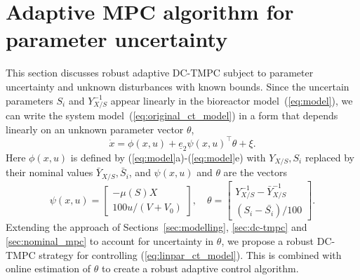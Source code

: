 \documentclass[final,5p,times,twocolumn,authoryear]{elsarticle}
\begin{document}


\section{Adaptive MPC algorithm for parameter uncertainty}\label{sec:ampc}

This section discusses robust adaptive DC-TMPC subject to parameter uncertainty and unknown disturbances with known bounds.
%
Since the uncertain parameters  $S_i$ and $Y_{X/S}^{-1}$ appear linearly in the bioreactor model~(\ref{eq:model}), we can write the system model~(\ref{eq:original_ct_model}) in a form that depends linearly on an unknown parameter vector $\theta$,
\begin{equation}\label{eq:linpar_ct_model}
  \dot{x} =\phi(x,u) + \underline{e}_2 \psi(x,u)^\top \theta + \xi .
\end{equation}
Here $\phi(x,u)$ is defined by (\ref{eq:model}a)-(\ref{eq:model}e) with $Y_{X/S}, S_i$ replaced by their nominal values $\bar{Y}_{X/S}, \bar{S}_i$, and $\psi(x,u)$ and $\theta$ are the vectors
\[
  \psi (x, u ) = \begin{bmatrix} -\mu(S) X \\ 100 u/(V+V_0) \end{bmatrix} ,
  \quad
\theta = \begin{bmatrix} Y_{X/S}^{-1} - \bar{Y}_{X/S}^{-1} \\ (S_i - \bar{S_i})/100 \end{bmatrix} .
\]
Extending the approach of Sections~\ref{sec:modelling}, \ref{sec:dc-tmpc} and \ref{sec:nominal_mpc} to account for uncertainty in $\theta$, we propose a robust DC-TMPC strategy for controlling (\ref{eq:linpar_ct_model}). 
This is combined with online estimation of $\theta$ to create a robust adaptive control algorithm.
\end{document}
